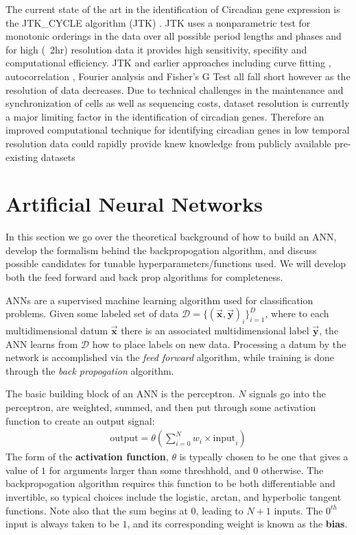 \documentclass[prl,amsmath,amssymb,floatfix,superscriptaddress,notitlepage,twocolumn]{revtex4}
\newcommand{\ee}[1]{\begin{align} #1 \end{align}} 						%
\newcommand{\vc}[1]{\vec{\mathbf{#1}}} 								%
\begin{document}
The current state of the art in the identification of Circadian gene expression is the JTK\_CYCLE algorithm (JTK) \cite{Hughes10}.  JTK uses a nonparametric test for monotonic orderings in the data over all possible period lengths and phases and for high (~2hr) resolution data it provides high sensitivity, specifity and computational efficiency.  JTK and earlier approaches including curve fitting \cite{Straume04}, autocorrelation \cite{Levine02}, Fourier analysis \cite{Wichert04,Whitfield04} and Fisher's G Test \cite{Wichert04} all fall short however as the resolution of data decreases.  Due to technical challenges in the maintenance and synchronization of cells as well as sequencing costs, dataset resolution is currently a major limiting factor in the identification of circadian genes.  Therefore an improved computational technique for identifying circadian genes in low temporal resolution data could rapidly provide knew knowledge from publicly available pre-existing datasets

\section{Artificial Neural Networks}
In this section we go over the theoretical background of how to build an ANN, develop the formalism behind the backpropogation algorithm, and discuss possible candidates for tunable hyperparameters/functions used. We will develop both the feed forward and back prop algorithms for completeness. 

ANNs are a supervised machine learning algorithm used for classification problems. Given some labeled set of data $\mathcal{D}=\{(\vc x,\vc y)_i\}_{i=1}^D$, where to each multidimensional datum $\vc x$ there is an associated multidimensional label $\vc y$, the ANN learns from $\mathcal{D}$ how to place labels on new data. Processing a datum by the network is accomplished via the \textit{feed forward} algorithm, while training is done through the \textit{back propogation} algorithm. 

The basic building block of an ANN is the perceptron. $N$ signals go into the perceptron, are weighted, summed, and then put through some activation function to create an output signal:
\ee{
\label{perceptron}
\text{output}=\theta(\sum_{i=0}^{N}w_i\times\text{input}_i)
}
The form of the \textbf{activation function}, $\theta$ is typcally chosen to be one that gives a value of $1$ for arguments larger than some threshhold, and $0$ otherwise. The backpropogation algorithm requires this function to be both differentiable and invertible, so typical choices include the logistic, arctan, and hyperbolic tangent functions. Note also that the sum begins at $0$, leading to $N+1$ inputs. The $0^{th}$ input is always taken to be $1$, and its corresponding weight is known as the \textbf{bias}.
\end{document}

